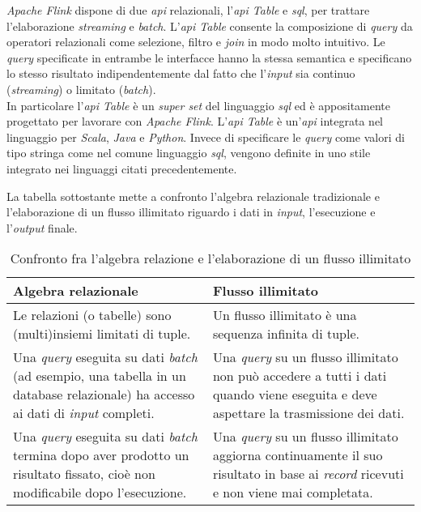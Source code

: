 \textit{Apache Flink} dispone di due \textit{\gls{api}} relazionali, l'\textit{\textit{\gls{api}} Table} e \textit{\textit{\gls{sql}}}, per trattare l'elaborazione \textit{streaming} e \textit{batch}. L'\textit{\textit{\gls{api}} Table} consente la composizione di \textit{\gls{query}} da operatori relazionali come selezione, filtro e \textit{join} in modo molto intuitivo. Le \textit{\gls{query}} specificate in entrambe le interfacce hanno la stessa semantica e specificano lo stesso risultato indipendentemente dal fatto che l'\textit{input} sia continuo (\textit{streaming}) o limitato (\textit{batch}).\\
In particolare l'\textit{\textit{\gls{api}} Table} è un \textit{super set} del linguaggio \textit{\gls{sql}} ed è appositamente progettato per lavorare con \textit{Apache Flink}. L'\textit{\textit{\gls{api}} Table} è un'\textit{\gls{api}} integrata nel linguaggio per \textit{Scala}, \textit{Java} e \textit{Python}. Invece di specificare le \textit{\gls{query}} come valori di tipo stringa come nel comune linguaggio \textit{\gls{sql}}, vengono definite in uno stile integrato nei linguaggi citati precedentemente.

La tabella sottostante mette a confronto l'algebra relazionale tradizionale e l'elaborazione di un flusso illimitato riguardo i dati in \textit{input}, l'esecuzione e l'\textit{output} finale.

\begin{table}[H]
\caption{Confronto fra l'algebra relazione e l'elaborazione di un flusso illimitato}
\label{tab:algebraRelazionale-flussoIllimitato}
\begin{tabularx}{\textwidth}{XX}
\hline
\textbf{Algebra relazionale} & \textbf{Flusso illimitato}\\
\hline
Le relazioni (o tabelle) sono (multi)insiemi limitati di tuple.     & Un flusso illimitato è una sequenza infinita di tuple. \\
\hline
Una \textit{\gls{query}} eseguita su dati \textit{batch} (ad esempio, una tabella in un database relazionale) ha accesso ai dati di \textit{input} completi.    & Una \textit{\gls{query}} su un flusso illimitato non può accedere a tutti i dati quando viene eseguita e deve aspettare la trasmissione dei dati. \\
\hline
Una \textit{\gls{query}} eseguita su dati \textit{batch} termina dopo aver prodotto un risultato fissato, cioè non modificabile dopo l'esecuzione. & Una \textit{\gls{query}} su un flusso illimitato aggiorna continuamente il suo risultato in base ai \textit{record} ricevuti e non viene mai completata. \\
\hline
\end{tabularx}
\end{table}%

